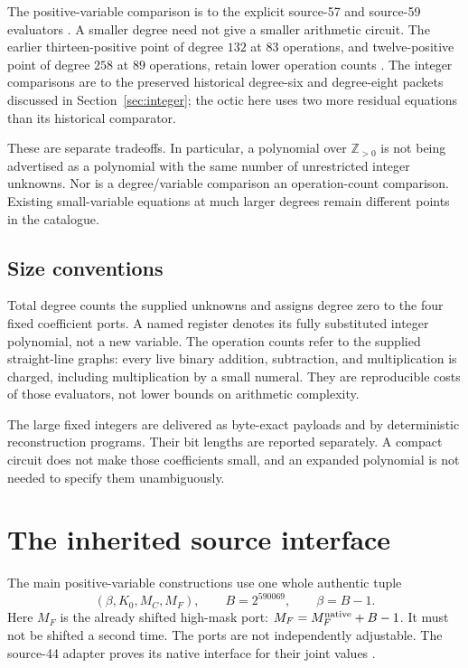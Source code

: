 \documentclass[11pt,a4paper]{article}
\theoremstyle{definition}
\theoremstyle{remark}
\newcommand{\Zpos}{\mathbb Z_{>0}}
\begin{document}
The positive-variable comparison is to the explicit source-57 and
source-59 evaluators \cite{source57,source59}. A smaller degree need not
give a smaller arithmetic circuit. The earlier thirteen-positive point
of degree \(132\) at \(83\) operations, and twelve-positive point of
degree \(258\) at \(89\) operations, retain lower operation counts
\cite{source57}. The integer comparisons are to the preserved historical
degree-six and degree-eight packets discussed in
Section~\ref{sec:integer}; the octic here uses two more residual equations
than its historical comparator.

These are separate tradeoffs. In particular, a polynomial over
\(\Zpos\) is not being advertised as a polynomial with the same number
of unrestricted integer unknowns. Nor is a degree/variable comparison an
operation-count comparison. Existing small-variable equations at much
larger degrees remain different points in the catalogue.

\subsection{Size conventions}

Total degree counts the supplied unknowns and assigns degree zero to the
four fixed coefficient ports. A named register denotes its fully
substituted integer polynomial, not a new variable. The operation counts
refer to the supplied straight-line graphs: every live binary
addition, subtraction, and multiplication is charged, including
multiplication by a small numeral. They are reproducible costs of those
evaluators, not lower bounds on arithmetic complexity.

The large fixed integers are delivered as byte-exact payloads and by
deterministic reconstruction programs. Their bit lengths are reported
separately. A compact circuit does not make those coefficients small, and
an expanded polynomial is not needed to specify them unambiguously.

\section{The inherited source interface}
\label{sec:source}

The main positive-variable constructions use one whole authentic tuple
\[
 (\beta,K_0,M_C,M_F),\qquad
 B=2^{590069},\qquad \beta=B-1.
\]
Here \(M_F\) is the already shifted high-mask port:
\(M_F=M_F^{\rm native}+B-1\). It must not be shifted a second time.
The ports are not independently adjustable. The source-44 adapter proves
its native interface for their joint values \cite{source44}.
\end{document}
